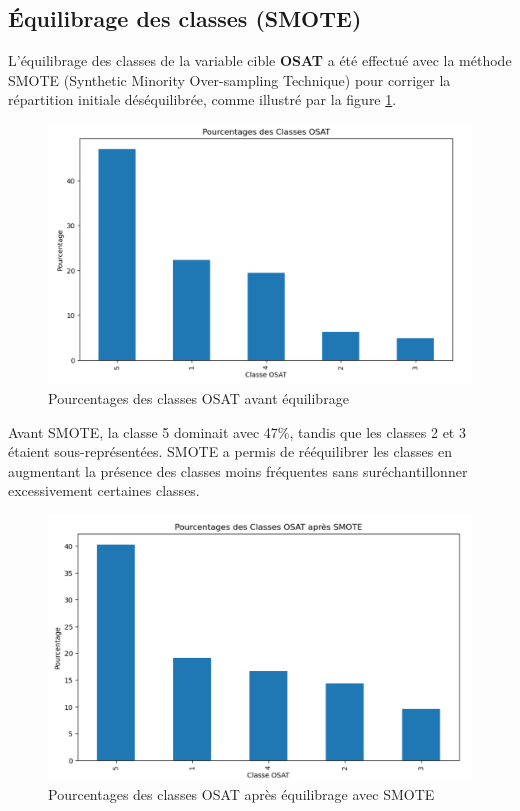 \subsection{Équilibrage des classes (SMOTE)}

L'équilibrage des classes de la variable cible \textbf{OSAT} a été effectué avec la méthode SMOTE (Synthetic Minority Over-sampling Technique) pour corriger la répartition initiale déséquilibrée, comme illustré par la figure \ref{smote_avant}.

\begin{figure}[H]
    \centering
    \includegraphics[width=0.7\linewidth]{capture_sas_57.png}
    \caption{Pourcentages des classes OSAT avant équilibrage}
    \label{smote_avant}
\end{figure}

Avant SMOTE, la classe 5 dominait avec 47\%, tandis que les classes 2 et 3 étaient sous-représentées. SMOTE a permis de rééquilibrer les classes en augmentant la présence des classes moins fréquentes sans suréchantillonner excessivement certaines classes.

\begin{figure}[H]
    \centering
    \includegraphics[width=0.7\linewidth]{capture_sas_59.png}
    \caption{Pourcentages des classes OSAT après équilibrage avec SMOTE}
    \label{smote_aprés}
\end{figure}

